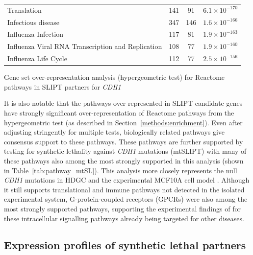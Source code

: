 \begin{table}[!ht]
{\begin{threeparttable}
\begin{tabular}{lccc}
  \rowcolor{black!5}
  Translation & 141 &  91 & $6.1 \times 10^{-170}$ \\ 
  \rowcolor{black!10}
  Infectious disease & 347 & 146 & $1.6 \times 10^{-166}$ \\ 
  \rowcolor{black!5}
  Influenza Infection & 117 &  81 & $1.9 \times 10^{-163}$ \\ 
  \rowcolor{black!10}
  Influenza Viral RNA Transcription and Replication & 108 &  77 & $1.9 \times 10^{-160}$ \\ 
  \rowcolor{black!5}
  Influenza Life Cycle & 112 &  77 & $2.5 \times 10^{-156}$ \\ 
   \hline
\end{tabular}
\begin{tablenotes}
\raggedright \small
Gene set over-representation analysis (hypergeometric test) for Reactome pathways in \gls{SLIPT} partners for \textit{CDH1}
\end{tablenotes}
\end{threeparttable}
}
\end{table}

It is also notable that the pathways over-represented in \gls{SLIPT} candidate genes have strongly significant over-representation of Reactome pathways from the hypergeometric test (as described in Section~\ref{methods:enrichment}). Even after adjusting stringently for multiple tests, biologically related pathways give consensus support to these pathways. These pathways are further supported by testing for synthetic lethality against \textit{CDH1} mutations (mtSLIPT) with many of these pathways also among the most strongly supported in this analysis (shown in Table~\ref{tab:pathway_mtSL}). This analysis more closely represents the null \textit{CDH1} mutations in HDGC \citep{Guilford1998} and the experimental MCF10A cell model \citep{Chen2014}. Although it still supports translational and immune pathways not detected in the isolated experimental system, G-protein-coupled receptors (GPCRs) were also among the most strongly supported pathways, supporting the experimental findings of \citet{Telford2015} for these intracellular signalling pathways already being targeted for other diseases. 


\FloatBarrier


\subsection{Expression profiles of synthetic lethal partners} \label{chapt3:exprSL_clusters}

